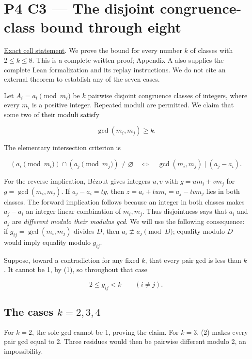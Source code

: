 \documentclass[11pt,a4paper]{article}
\begin{document}
\section{P4 C3 --- The disjoint congruence-class bound through eight}\label{p4-c3-the-disjoint-congruence-class-bound-through-eight}

\href{https://hackathon.bainsa.ai/p/p4/c3}{Exact cell statement}. We prove the bound for every number \(k\) of classes with \(2\le k\le8\). This is a complete written proof; Appendix A also supplies the complete Lean formalization and its replay instructions. We do not cite an external theorem to establish any of the seven cases.

Let \(A_i=a_i\pmod{m_i}\) be \(k\) pairwise disjoint congruence classes of integers, where every \(m_i\) is a positive integer. Repeated moduli are permitted. We claim that some two of their moduli satisfy

\[
\gcd(m_i,m_j)\ge k.
\]

The elementary intersection criterion is

\[
(a_i\pmod{m_i})\cap(a_j\pmod{m_j})\ne\varnothing
\quad\Longleftrightarrow\quad
\gcd(m_i,m_j)\mid(a_j-a_i).
\tag{1}
\]

For the reverse implication, B\'{e}zout gives integers \(u,v\) with \(g=u m_i+v m_j\) for \(g=\gcd(m_i,m_j)\). If \(a_j-a_i=tg\), then \(z=a_i+tum_i=a_j-tvm_j\) lies in both classes. The forward implication follows because an integer in both classes makes \(a_j-a_i\) an integer linear combination of \(m_i,m_j\). Thus disjointness says that \(a_i\) and \(a_j\) are \emph{different modulo their modulus gcd}. We will use the following consequence: if \(g_{ij}=\gcd(m_i,m_j)\) divides \(D\), then \(a_i\not\equiv a_j\pmod D\); equality modulo \(D\) would imply equality modulo \(g_{ij}\).

Suppose, toward a contradiction for any fixed \(k\), that every pair gcd is less than \(k\). It cannot be 1, by (1), so throughout that case

\[
2\le g_{ij}<k\qquad(i\ne j).
\tag{2}
\]

\subsection{\texorpdfstring{The cases \(k=2,3,4\)}{The cases k=2,3,4}}\label{the-cases-k234}

For \(k=2\), the sole gcd cannot be 1, proving the claim. For \(k=3\), (2) makes every pair gcd equal to 2. Three residues would then be pairwise different modulo 2, an impossibility.
\end{document}

